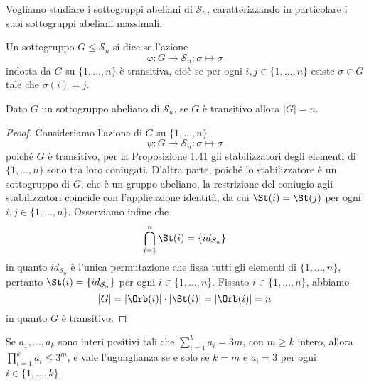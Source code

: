 \documentclass[11pt]{scrartcl}
\begin{document}
	Vogliamo studiare i sottogruppi abeliani di $\mathcal{S}_n$, caratterizzando in particolare
	i suoi sottogruppi abeliani massimali.
	
	\begin{definition}
		Un sottogruppo $G\leqslant \mathcal{S}_n$ si dice  se l'azione
		\[
		\varphi: G\longrightarrow \mathcal{S}_n :\sigma \longmapsto \sigma
		\]indotta da $G$ su $\{1, \ldots, n\}$ è transitiva, cioè se per ogni
		$i, j \in \{1, \ldots, n\}$ esiste $\sigma \in G$ tale che $\sigma(i) = j$.
	\end{definition}
	
	\begin{lemma}
		\label{lemma1.54}
		Dato $G$ un sottogruppo abeliano di $\mathcal{S}_n$, se $G$ è transitivo allora $|G| = n$.
	\end{lemma}
	
	\begin{proof}
		Consideriamo l'azione di $G$ su $\{1, \ldots, n\}$
		\[
		\psi : G\longrightarrow \mathcal{S}_n :\sigma \longmapsto \sigma
		\]
		poiché $G$ è transitivo, per la \hyperref[prop1.41]{Proposizione 1.41}
		gli stabilizzatori degli elementi di $\{1, \ldots, n\}$ sono tra loro coniugati.
		D'altra parte, poiché lo stabilizzatore è un sottogruppo di $G$, che
		è un gruppo abeliano, la restrizione del coniugio agli
		stabilizzatori coincide con l'applicazione identità, da cui $\St(i) = \St(j)$
		per ogni $i, j \in \{1, \ldots, n\}$. Osserviamo infine che 
		\[
		\bigcap_{i = 1}^n \St(i) = \{id_{\mathcal{S}_n}\}
		\]in quanto $id_{\mathcal{S}_n}$ è l'unica permutazione che fissa tutti gli elementi
		di $\{1, \ldots, n\}$, pertanto $\St(i) = \{id_{\mathcal{S}_n}\}$ per ogni $i \in \{1, \ldots, n\}$.
		Fissato $i \in \{1, \ldots, n\}$, abbiamo 
		\[
		|G| = |\Orb(i)|\cdot|\St(i)| = |\Orb(i)| = n
		\]
		in quanto $G$ è transitivo.
	\end{proof}
	
	\begin{lemma}
		\label{lemma1.55}
		Se $a_1, \ldots, a_k$ sono interi positivi tali che $\displaystyle
		\sum_{i = 1}^k a_i = 3m$,
		con $m \geqslant k$ intero, allora $\displaystyle
		\prod_{i = 1}^k a_i \leq 3^m$, 
		e vale l'uguaglianza se e solo se $k = m$ e $a_i = 3$ per ogni $i \in \{1, \ldots, k\}$.
	\end{lemma}
	
\end{document}

